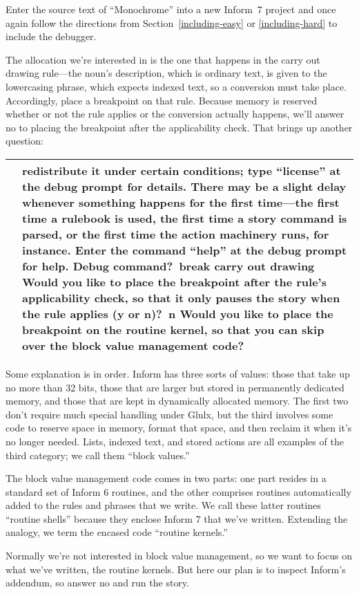 \documentclass{book}
\newcommand{\n}{\hspace*{\fill}\newline}
\newcommand{\terp}[2]{\begin{center}\begin{tabular}{p{0.45\textwidth}|p{0.45\textwidth}}\midrule #1&#2\\\midrule\end{tabular}\end{center}}
\newcommand{\glkinput}[1]{\textbf{#1}}
\newcommand{\cursor}{\raisebox{-1.5pt}{\RectangleThin}}
\begin{document}
Enter the source text of ``Monochrome'' into a new Inform~7 project and once
again follow the directions from Section~\ref{including-easy} or
\ref{including-hard} to include the debugger.

The allocation we're interested in is the one that happens in the carry out
drawing rule---the noun's description, which is ordinary text, is given to the
lowercasing phrase, which expects indexed text, so a conversion must take place.
Accordingly, place a breakpoint on that rule.  Because memory is reserved
whether or not the rule applies or the conversion actually happens, we'll answer
no to placing the breakpoint after the applicability check.  That brings up
another question:

\terp{\null}{%
  redistribute it under certain conditions; type ``license'' at the debug prompt for details.\n
  \n
  There may be a slight delay whenever something happens for the first time---the first time a rulebook is used, the first time a story command is parsed, or the first time the action machinery runs, for instance.\n
  \n
  Enter the command ``help'' at the debug prompt for help.\n
  \n
  Debug command?\ \glkinput{break carry out drawing}\n
  \n
  Would you like to place the breakpoint after the rule's applicability check, so that it only pauses the story when the rule applies (y or n)?\ \glkinput{n}\n
  \n
  Would you like to place the breakpoint on the routine kernel, so that you can skip over the block value management code?\ \cursor}

Some explanation is in order.  Inform has three sorts of values: those that take
up no more than 32 bits, those that are larger but stored in permanently
dedicated memory, and those that are kept in dynamically allocated memory.  The
first two don't require much special handling under Glulx, but the third
involves some code to reserve space in memory, format that space, and then
reclaim it when it's no longer needed.  Lists, indexed text, and stored actions
are all examples of the third category; we call them ``block values.''

The block value management code comes in two parts: one part resides in a
standard set of Inform 6 routines, and the other comprises routines
automatically added to the rules and phrases that we write.  We call these
latter routines ``routine shells'' because they enclose Inform 7 that we've
written.  Extending the analogy, we term the encased code ``routine kernels.''

Normally we're not interested in block value management, so we want to focus on
what we've written, the routine kernels.  But here our plan is to inspect
Inform's addendum, so answer no and run the story.
\end{document}
